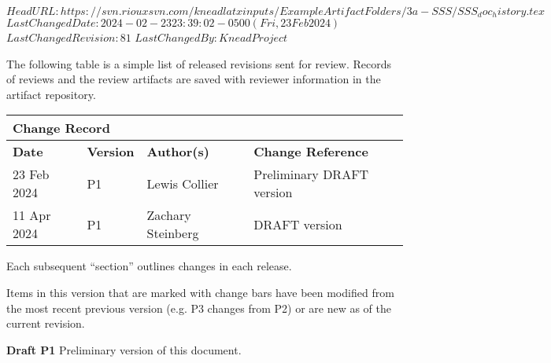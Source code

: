 \svnidlong
{$HeadURL: https://svn.riouxsvn.com/kneadlatxinputs/ExampleArtifactFolders/3a-SSS/SSS_doc_history.tex $}
{$LastChangedDate: 2024-02-23 23:39:02 -0500 (Fri, 23 Feb 2024) $}
{$LastChangedRevision: 81 $}
{$LastChangedBy: KneadProject $}

The following table is a simple list of released revisions sent for review.
Records of reviews and the review artifacts are saved with reviewer information in the \KNEADagencyName artifact repository.

\begin{table}[h]
	\centering 
		\begin{tabular}{|p{1.0in}|p{0.8in}|p{1.4in}|p{2.1in}|}
    \multicolumn{4}{l}{\bfseries Change Record} \\
		\hline
			{\bfseries Date}  &  {\bfseries Version} & {\bfseries Author(s)} & {\bfseries Change Reference} \\
		\hline
		\hline
			 23 Feb 2024	&	\centering	P1	&	{\raggedright Lewis Collier}	&	Preliminary DRAFT version  \\ \hline
			 11 Apr 2024	&	\centering	P1	&	{\raggedright Zachary Steinberg}	&	DRAFT version  \\ \hline
		\hline		\hline				
  	\end{tabular}
\end{table}

Each subsequent ``section'' outlines changes in each release.

Items in this version that are marked with change bars have been modified from the most recent previous version (e.g. P3 changes from P2) or are new as of the current revision. 

{\bf Draft P1}
Preliminary version of this document.


